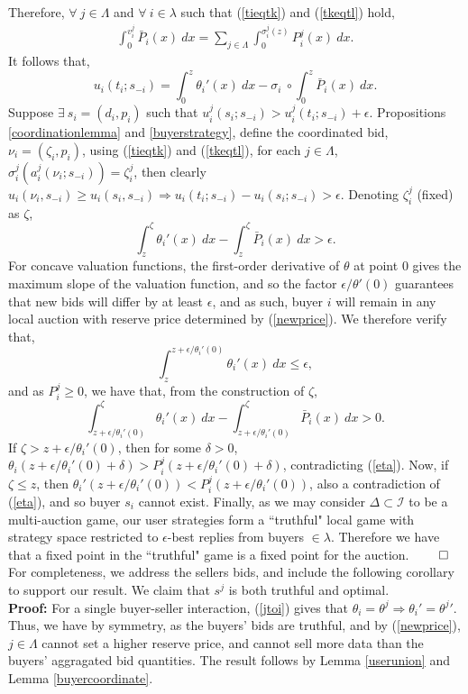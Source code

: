 \documentclass[sigconf, anonymous]{acmart}
\newcommand{\mcI}{\mathcal{I}}
\newcommand{\g}{\sigma}
\theoremstyle{definition}
\begin{document}
Therefore, $\forall \ j\in\Lambda$ and $\forall \ i \in \lambda$ such that
(\ref{tieqtk}) and (\ref{tkeqtl}) hold,
\begin{align*}
    \int_0^{v_i^j} \bar{P}_i(x) \ dx 
    = \sum_{j\in\Lambda}\int_0^{\g_i^j(z)} P_i^j(x) \ dx.
\end{align*}
It follows that,
$$
    u_i(t_i;s_{-i}) = \int_0^{z} \theta_i'(x) \ dx -  \g_i \ \circ \int_0^{z} \bar{P}_i(x) \ dx.
$$
Suppose $\exists \ s_i = (d_i, p_i)$ such that $u_i^j(s_i;s_{-i}) > u_i^j(t_i;
s_{-i}) + \epsilon$. Propositions
\ref{coordinationlemma} and
\ref{buyerstrategy}, define the coordinated bid, $\nu_i=(\zeta_i, p_i)$,
using (\ref{tieqtk}) and (\ref{tkeqtl}),
for each $j\in \Lambda$, $\g_i^j(a_i^j(\nu_i; s_{-i})) = \zeta_i^j$,
then clearly $u_i(\nu_i, s_{-i}) \ge u_i(s_i, s_{-i}) \Rightarrow u_i(t_i;s_{-i}) -
u_i(s_i;s_{-i}) > \epsilon$. Denoting $\zeta_i^j$ (fixed) as $\zeta$, 
$$
    \int_z^{\zeta} {\theta_i}'(x) \ dx-\int_z^{\zeta} \bar{P}_i(x) \ dx > \epsilon.
$$
For concave valuation functions, the first-order derivative of $\theta$ at point
$0$ gives the maximum slope of the valuation function, and so the factor $\epsilon
/ \theta'(0)$ guarantees that new bids will differ by at least
$\epsilon$, and as such, buyer $i$ will remain in
any local auction with reserve price determined by (\ref{newprice}). We therefore
verify that,
$$
    \displaystyle\int_{z}^{z +\epsilon / \theta_i'(0)} \theta_i'(x) \
dx \le \epsilon,
$$
and as $P_i^j \ge 0$, we have that, from the construction of $\zeta$,
$$
    \displaystyle\int_{z+\epsilon / \theta_i'(0)}^\zeta \theta_i'(x) \ dx -
\int_{z+\epsilon / \theta_i'(0)}^\zeta \bar{P}_i(x) \ dx > 0.
$$
If $\zeta > z + \epsilon / \theta_i'(0)$, then for some $\delta >0$,
$\theta_i(z+\epsilon / \theta_i'(0)+\delta) > P_i^j(z+\epsilon /
\theta_i'(0)+\delta)$, contradicting (\ref{eta}).
Now, if $\zeta \le z$, then $\theta_i'(z+\epsilon / \theta_i'(0)) < P_i^j(z+\epsilon /
\theta_i'(0))$, also a contradiction of (\ref{eta}), and so buyer $s_i$ cannot
exist.
Finally, as we may consider $\Delta \subset \mcI$ to be a
multi-auction game, our user strategies form a ``truthful" local game 
with strategy space restricted to $\epsilon$-best replies from buyers $\in
\lambda$. Therefore we have that a fixed point in the ``truthful" game is a fixed point for the auction. 
$\qed$\\
For completeness, we address the sellers bids, and include the following corollary to support our result.
{
We claim that $s^j$ is both truthful and optimal.
}\\
\textbf{Proof:}
For a single buyer-seller interaction, (\ref{jtoi}) gives that $\theta_i =
\theta^j \Rightarrow \theta_i' = {\theta^j}'$. Thus, we have by symmetry, as the buyers' bids are
truthful, and by (\ref{newprice}), $j\in\Lambda$ cannot set a higher reserve price, 
and cannot sell more data than the buyers' aggragated bid quantities.
The result follows by Lemma \ref{userunion} and Lemma \ref{buyercoordinate}.\\
\end{document}
